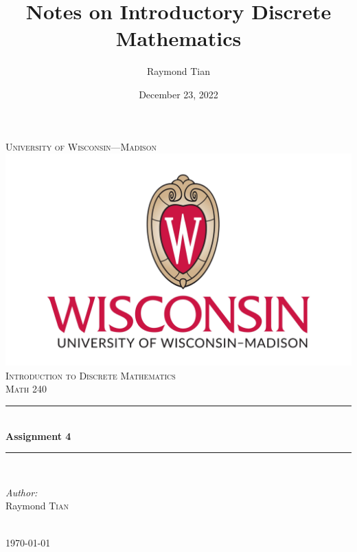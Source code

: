 \documentclass{report}
\title{Notes on Introductory Discrete Mathematics}
\author{Raymond Tian}
\date{December 23, 2022}
\theoremstyle{mytheoremstyle}
\theoremstyle{mytheoremstyle}
\theoremstyle{myproblemstyle}
\begin{document}
\begin{titlepage}
\newcommand{\HRule}{\rule{\linewidth}{0.5mm}}  
\begin{center}
\textsc{\LARGE University of Wisconsin---Madison}\\[1.5cm] 
\includegraphics[scale=.1]{../../images/uw-logo.png}\\[1cm] 
\textsc{\Large Introduction to Discrete Mathematics}\\[0.5cm] 
\textsc{\large Math 240}\\[0.5cm] 

\HRule \\[0.4cm]
{ \huge \bfseries Assignment 4}\\[0.4cm] 
\HRule \\[1.5cm]

\begin{minipage}{0.4\textwidth}
\begin{flushleft} \large
\emph{Author:}\\
Raymond \textsc{Tian}\\ 
\end{flushleft}

\end{minipage}\\[2cm]

{\large \today}\\[2cm] 

\vfill 

\end{center}
\end{titlepage}

\pagestyle{empty}
\newpage
\pagestyle{fancy}
\newpage
\end{document}
